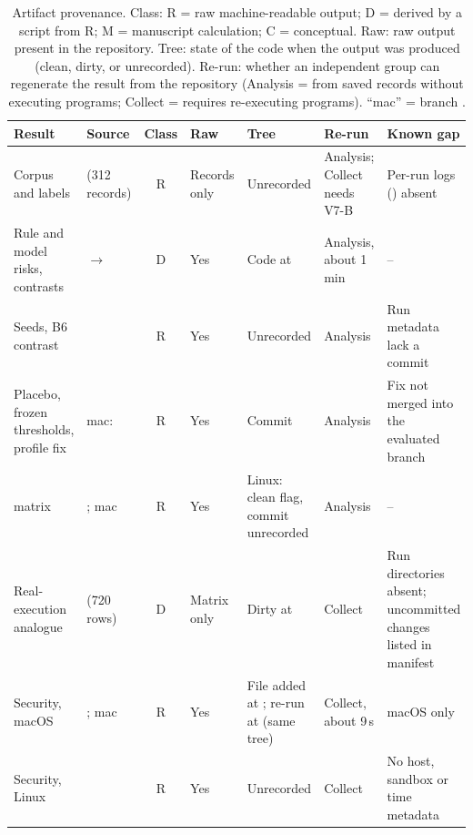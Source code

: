 \begin{table}[!t]
\caption{Artifact provenance. Class: R = raw machine-readable output; D = derived by a script from R; M = manuscript calculation; C = conceptual. Raw: raw output present in the repository. Tree: state of the code when the output was produced (clean, dirty, or unrecorded). Re-run: whether an independent group can regenerate the result from the repository (Analysis = from saved records without executing programs; Collect = requires re-executing programs). ``mac'' = branch .}
\label{tab:artifacts}
\centering
\scriptsize
\setlength{\tabcolsep}{2.4pt}
\renewcommand{\arraystretch}{1.08}
\begin{tabular}{|L{2.6cm}|L{4.4cm}|c|L{1.0cm}|L{1.25cm}|L{1.45cm}|L{3.3cm}|}
\hline
Result & Source & Class & Raw & Tree & Re-run & Known gap \\
\hline
Corpus and labels &  (312 records) & R & Records only & Unrecorded & Analysis; Collect needs V7-B & Per-run logs () absent \\
Rule and model risks, contrasts &  $\to$  & D & Yes & Code at  & Analysis, about 1 min & -- \\
Seeds, B6 contrast &  & R & Yes & Unrecorded & Analysis & Run metadata lack a commit \\
Placebo, frozen thresholds, profile fix & mac:  & R & Yes & Commit  & Analysis & Fix not merged into the evaluated branch \\
\ers{} matrix & ; mac  & R & Yes & Linux: clean flag, commit unrecorded & Analysis & -- \\
Real-execution analogue &  (720 rows) & D & Matrix only & Dirty at  & Collect & Run directories absent; uncommitted changes listed in manifest \\
Security, macOS & ; mac  & R & Yes & File added at ; re-run at  (same  tree) & Collect, about 9\,s & macOS only \\
Security, Linux &  & R & Yes & Unrecorded & Collect & No host, sandbox or time metadata \\

\end{tabular}
\end{table}

